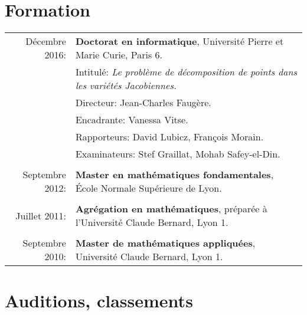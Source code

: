 \documentclass[11pt]{article}
\begin{document}
\section{Formation}

\hspace{-0.35cm} \begin{tabular}{rl}
 Décembre 2016: & \textbf{Doctorat en informatique}, Université Pierre et Marie Curie, Paris 6.\\
                & Intitulé: {\em Le problème de décomposition de points dans les variétés Jacobiennes.}\\
                & Directeur: Jean-Charles Faugère. \\
                & Encadrante: Vanessa Vitse.\\
                & Rapporteurs: David Lubicz, François Morain. \\
                &Examinateurs: Stef Graillat, Mohab Safey-el-Din.\\
                &  \\
Septembre 2012: & \textbf{Master en mathématiques fondamentales}, \'Ecole Normale Supérieure de Lyon.\\
                & \\
Juillet 2011:   & \textbf{Agrégation en mathématiques}, préparée à l'Université Claude Bernard, Lyon 1.\\
                & \\
Septembre 2010: & \textbf{Master de mathématiques appliquées}, Université Claude Bernard, Lyon 1.\\
\end{tabular}

\section{Auditions, classements}
\end{document}
